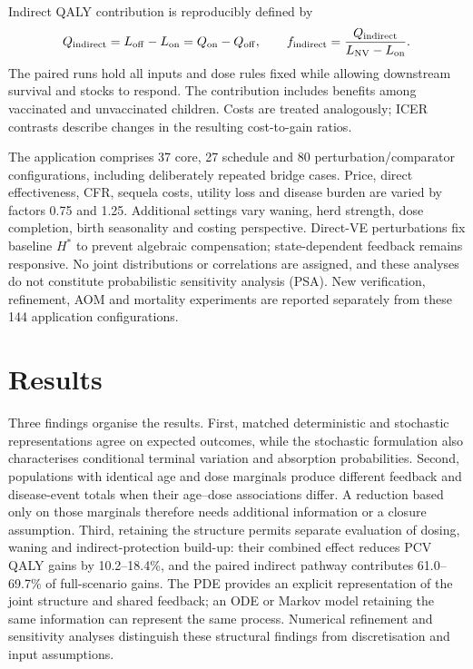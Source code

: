 \documentclass[10pt,letterpaper]{article}
\newcommand{\NV}{\mathrm{NV}}
\begin{document}
Indirect QALY contribution is reproducibly defined by
\begin{equation}
 Q_{\rm indirect}=L_{\rm off}-L_{\rm on}=Q_{\rm on}-Q_{\rm off},
 \qquad f_{\rm indirect}=\frac{Q_{\rm indirect}}{L_\NV-L_{\rm on}}.
 \label{eq:indirect}
\end{equation}
The paired runs hold all inputs and dose rules fixed while allowing downstream survival and stocks to respond. The contribution includes benefits among vaccinated and unvaccinated children. Costs are treated analogously; ICER contrasts describe changes in the resulting cost-to-gain ratios.

The application comprises 37 core, 27 schedule and 80 perturbation/comparator configurations, including deliberately repeated bridge cases. Price, direct effectiveness, CFR, sequela costs, utility loss and disease burden are varied by factors 0.75 and 1.25. Additional settings vary waning, herd strength, dose completion, birth seasonality and costing perspective. Direct-VE perturbations fix baseline $H^*$ to prevent algebraic compensation; state-dependent feedback remains responsive. No joint distributions or correlations are assigned, and these analyses do not constitute probabilistic sensitivity analysis (PSA). New verification, refinement, AOM and mortality experiments are reported separately from these 144 application configurations.

\section{Results}
Three findings organise the results. First, matched deterministic and stochastic representations agree on expected outcomes, while the stochastic formulation also characterises conditional terminal variation and absorption probabilities. Second, populations with identical age and dose marginals produce different feedback and disease-event totals when their age--dose associations differ. A reduction based only on those marginals therefore needs additional information or a closure assumption. Third, retaining the structure permits separate evaluation of dosing, waning and indirect-protection build-up: their combined effect reduces PCV QALY gains by 10.2--18.4\%, and the paired indirect pathway contributes 61.0--69.7\% of full-scenario gains. The PDE provides an explicit representation of the joint structure and shared feedback; an ODE or Markov model retaining the same information can represent the same process. Numerical refinement and sensitivity analyses distinguish these structural findings from discretisation and input assumptions.
\end{document}
